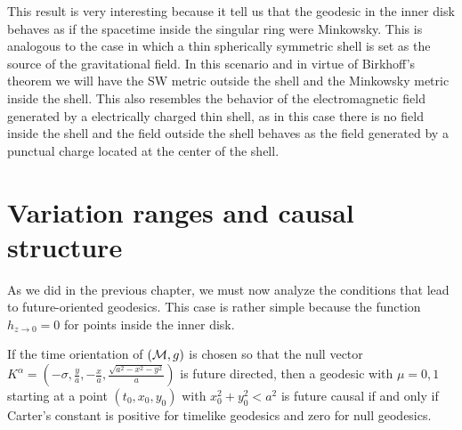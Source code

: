 This result is very interesting because it tell us that the geodesic in the inner disk behaves as if the spacetime inside the singular ring were Minkowsky. This is analogous to the case in which a thin spherically symmetric shell is set as the source of the gravitational field. In this scenario and in virtue of Birkhoff's theorem \cite{birkhoff1923relativity} we will have the \gls{SW} metric outside the shell and the Minkowsky metric inside the shell. This also resembles the behavior of the electromagnetic field generated by a electrically charged thin shell, as in this case there is no field inside the shell and the field outside the shell behaves as the field generated by a punctual charge located at the center of the shell.

\section{Variation ranges and causal structure}\label{variationpe}
As we did in the previous chapter, we must now analyze the conditions that lead to future-oriented geodesics. This case is rather simple because the function $h_{z \to 0}=0$ for points inside the inner disk. 
\begin{lemma}
 If the time orientation of $({\mathcal M},g)$ is chosen so that
the null vector 
$K^\alpha=\left(-\sigma ,\frac{y}{a},-\frac{x}{a},\frac{\sqrt{a^2-x^2-y^2}}{a}\right)$
is future directed, then a geodesic with $\mu=0,1$ 
starting at a point $(t_0,x_0,y_0)$ with $x_0^2+y_0^2<a^2$ is future causal 
if and only if Carter's constant is positive for timelike geodesics and zero for null geodesics. 
\end{lemma}
